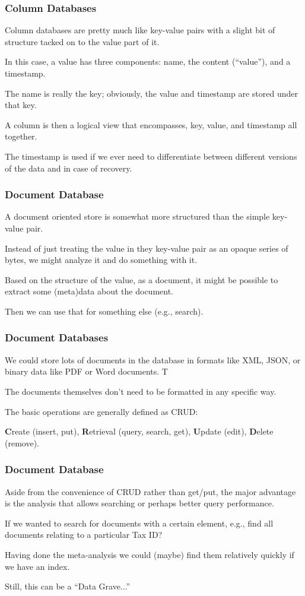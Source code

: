 \begin{frame}
\frametitle{Column Databases}

Column databases are pretty much like key-value pairs with a slight bit of structure tacked on to the value part of it. 

In this case, a value has three components: name, the content (``value''), and a timestamp. 

The name is really the key; obviously, the value and timestamp are stored under that key.

 A column is then a logical view that encompasses, key, value, and timestamp all together. 
 
 The timestamp is used if we ever need to differentiate between different versions of the data and in case of recovery.


\end{frame}


\begin{frame}
\frametitle{Document Database}

A document oriented store is somewhat more structured than the simple key-value pair. 

Instead of just treating the value in they key-value pair as an opaque series of bytes, we might analyze it and do something with it. 

Based on the structure of the value, as a document, it might be possible to extract some (meta)data about the document. 

Then we can use that for something else (e.g., search). 

\end{frame}



\begin{frame}
\frametitle{Document Databases}

We could store lots of documents in the database in formats like XML, JSON, or binary data like PDF or Word documents. T

The documents themselves don't need to be formatted in any specific way.

The basic operations are generally defined as CRUD:

\textbf{C}reate (insert, put), \textbf{R}etrieval (query, search, get), \textbf{U}pdate (edit), \textbf{D}elete (remove).

\end{frame}



\begin{frame}
\frametitle{Document Database}

Aside from the convenience of CRUD rather than get/put, the major advantage is the analysis that allows searching or perhaps better query performance. 

If we wanted to search for documents with a certain element, e.g., find all documents relating to a particular Tax ID?

Having done the meta-analysis we could (maybe) find them relatively quickly if we have an index.

Still, this can be a ``Data Grave...''

\end{frame}



